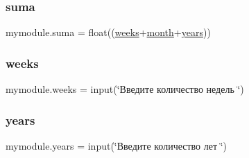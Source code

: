 \mbox{\label{namespacemymodule_a37055f99ce2a78a93a76df9065f10dfe}} 
\subsubsection{\texorpdfstring{suma}{suma}}
{\footnotesize\ttfamily mymodule.\+suma = float((\hyperlink{namespacemymodule_aaf8ad6924feda908422ed7502d97c2f5}{weeks}+\hyperlink{namespacemymodule_a773d7ebbde62af8bcd9dfc0ce6cdeda8}{month}+\hyperlink{namespacemymodule_aa9e1e22a07835d9e58ca7299410ff2c1}{years}))}

\mbox{\label{namespacemymodule_aaf8ad6924feda908422ed7502d97c2f5}} 
\subsubsection{\texorpdfstring{weeks}{weeks}}
{\footnotesize\ttfamily mymodule.\+weeks = input(\char`\"{}Введите количество недель \char`\"{})}

\mbox{\label{namespacemymodule_aa9e1e22a07835d9e58ca7299410ff2c1}} 
\subsubsection{\texorpdfstring{years}{years}}
{\footnotesize\ttfamily mymodule.\+years = input(\char`\"{}Введите количество лет \char`\"{})}

